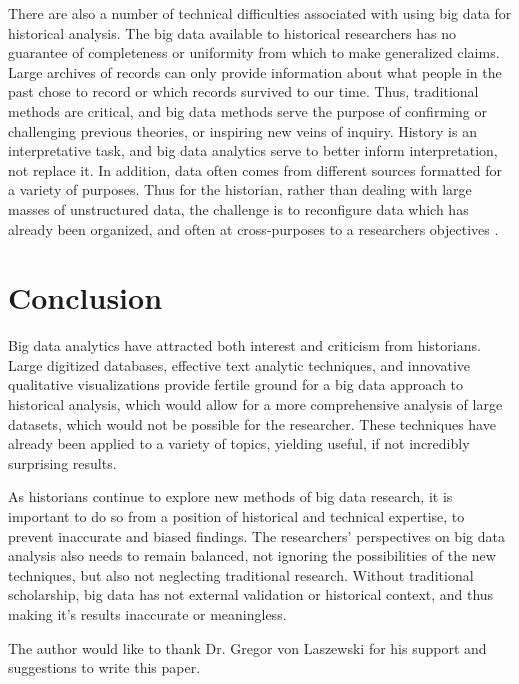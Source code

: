 \documentclass[sigconf]{acmart}
\begin{document}
There are also a number of technical difficulties associated with using big data for historical analysis. The big data available to historical researchers has no guarantee of completeness or uniformity from which to make generalized claims. Large archives of records can only provide information about what people in the past chose to record or which records survived to our time. Thus, traditional methods are critical, and big data methods serve the purpose of confirming or challenging previous theories, or inspiring new veins of inquiry. History is an interpretative task, and big data analytics serve to better inform interpretation, not replace it. In addition, data often comes from different sources formatted for a variety of purposes. Thus for the historian, rather than dealing with large masses of unstructured data, the challenge is to reconfigure data which has already been organized, and often at cross-purposes to a researchers objectives \cite{digitalrepublicletters}.

\section{Conclusion}

Big data analytics have attracted both interest and criticism from historians. Large digitized databases, effective text analytic techniques, and innovative qualitative visualizations provide fertile ground for a big data approach to historical analysis, which would allow for a more comprehensive analysis of large datasets, which would not be possible for the researcher. These techniques have already been applied to a variety of topics, yielding useful, if not incredibly surprising results. 

As  historians continue to explore new methods of big data research, it is important to do so from a position of historical and technical expertise, to prevent inaccurate and biased findings. The researchers' perspectives on big data analysis also needs to remain balanced, not ignoring the possibilities of the new techniques, but also not neglecting traditional research. Without traditional scholarship, big data has not external validation or historical context, and thus making it's results inaccurate or meaningless.

\begin{acks}

  The author would like to thank Dr. Gregor von Laszewski for his
  support and suggestions to write this paper.

\end{acks}


 


\end{document}
